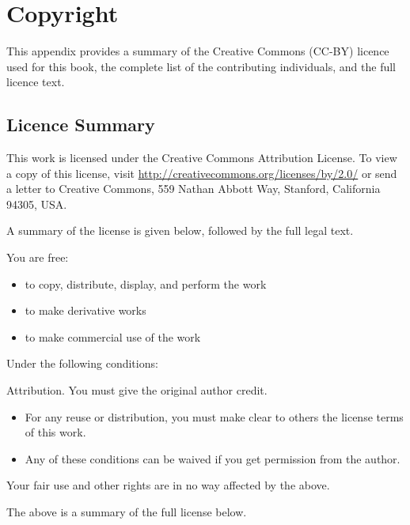 \documentclass[a4paper,10pt,twoside]{book}
\begin{document}
  \sloppy
\fi


\chapter{Copyright}

This appendix provides a summary of the Creative Commons (CC-BY) licence 
used for this book, the complete list of the contributing individuals,
and the full licence text.

\section{Licence Summary}

This work is licensed under the Creative Commons Attribution License.
To view a copy of this license, visit
\url{http://creativecommons.org/licenses/by/2.0/} or send a letter to
Creative Commons, 559 Nathan Abbott Way, Stanford, California 94305,
USA.

\noindent A summary of the license is given below, followed by the full legal
text.

\noindent You are free:

\begin{itemize}
  \item to copy, distribute, display, and perform the work
  \item to make derivative works
  \item to make commercial use of the work
\end{itemize}

\noindent Under the following conditions:
	
\noindent Attribution. You must give the original author credit.

\begin{itemize}
\item For any reuse or distribution, you must make clear to others the
      license terms of this work.

\item Any of these conditions can be waived if you get permission from
      the author.
\end{itemize}

\noindent Your fair use and other rights are in no way affected by the above.

\noindent The above is a summary of the full license below.
\end{document}

